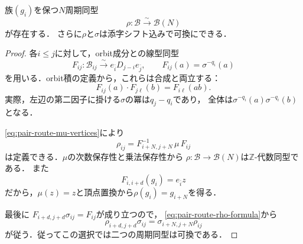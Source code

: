 \begin{lemma}
\label{lem:pair-route-rho}
族$(g_i)$を保つ$N$周期同型
\begin{equation}\label{eq:moduli-ambient-rho}
 \rho:\mathcal B\xrightarrow{\sim}\mathcal B(N)
\end{equation}
が存在する．
さらに$\rho$と$\sigma$は添字シフト込みで可換にできる．
\end{lemma}
\begin{proof}
各$i\leq j$に対して，orbit成分との線型同型
\begin{equation}\label{eq:pair-route-Fij}
 F_{ij}:\mathcal B_{ij}\xrightarrow{\sim}
       e_{\bar i}D_{j-i}e_{\bar j},\qquad
 F_{ij}(a)=\sigma^{-q_i}(a)
\end{equation}
を用いる．orbit積の定義から，これらは合成と両立する：
\begin{equation}
 F_{ij}(a)\cdot F_{j\ell}(b)=F_{i\ell}(ab).
\end{equation}
実際，左辺の第二因子に掛ける$\sigma$の冪は$q_j-q_i$であり，
全体は$\sigma^{-q_i}(a)\sigma^{-q_i}(b)$となる．

\eqref{eq:pair-route-mu-vertices}により
\begin{equation}\label{eq:pair-route-rho-formula}
 \rho_{ij}=F_{i+N,j+N}^{-1}\,\mu\,F_{ij}
\end{equation}
は定義できる．$\mu$の次数保存性と乗法保存性から
$\rho:\mathcal B\to\mathcal B(N)$は$\mathbb Z$-代数同型である．
また
\begin{equation}
 F_{i,i+d}(g_i)=e_{\bar i}z
\end{equation}
だから，$\mu(z)=z$と頂点置換から$\rho(g_i)=g_{i+N}$を得る．

最後に
$F_{i+d,j+d}\sigma_{ij}=F_{ij}$が成り立つので，
\eqref{eq:pair-route-rho-formula}から
\begin{equation}
 \rho_{i+d,j+d}\sigma_{ij}
 =\sigma_{i+N,j+N}\rho_{ij}
\end{equation}
が従う．従ってこの選択では二つの周期同型は可換である．
\end{proof}

